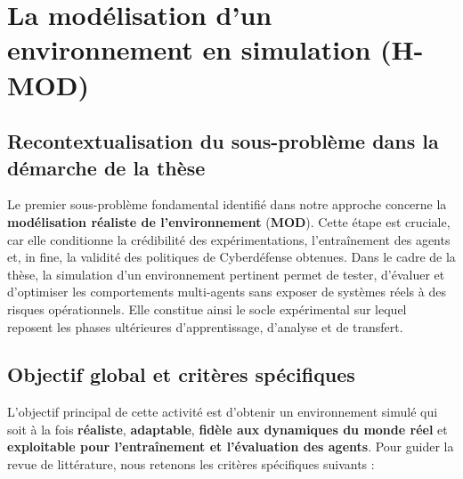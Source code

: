 \section{La modélisation d'un environnement en simulation (H-MOD)}

\subsection*{Recontextualisation du sous-problème dans la démarche de la thèse}

Le premier sous-problème fondamental identifié dans notre approche concerne la \textbf{modélisation réaliste de l'environnement} (\textbf{MOD}). Cette étape est cruciale, car elle conditionne la crédibilité des expérimentations, l'entraînement des agents et, in fine, la validité des politiques de Cyberdéfense obtenues. Dans le cadre de la thèse, la simulation d'un environnement pertinent permet de tester, d'évaluer et d'optimiser les comportements multi-agents sans exposer de systèmes réels à des risques opérationnels. Elle constitue ainsi le socle expérimental sur lequel reposent les phases ultérieures d'apprentissage, d'analyse et de transfert. \subsection*{Objectif global et critères spécifiques} L'objectif principal de cette activité est d'obtenir un environnement simulé qui soit à la fois \textbf{réaliste}, \textbf{adaptable}, \textbf{fidèle aux dynamiques du monde réel} et \textbf{exploitable pour l'entraînement et l'évaluation des agents}. Pour guider la revue de littérature, nous retenons les critères spécifiques suivants :
%
